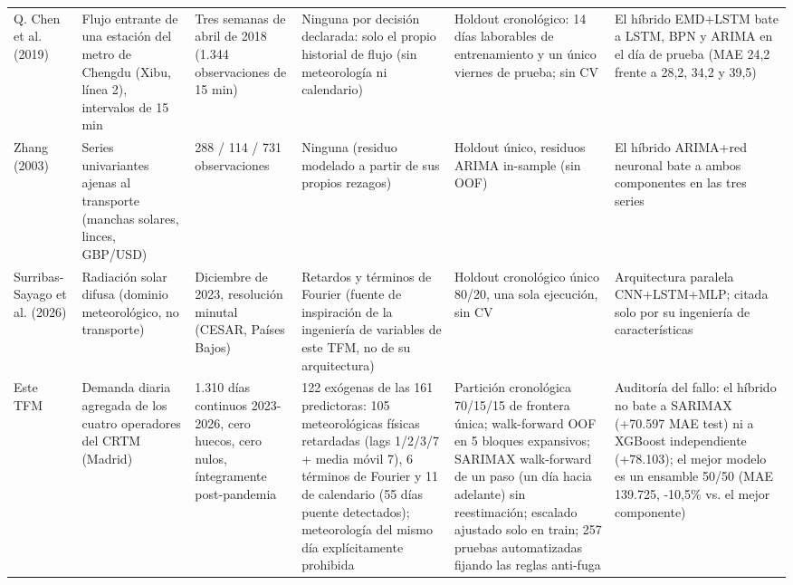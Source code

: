 \begin{tabular}{p{2.6cm}p{3.6cm}p{3.0cm}p{4.2cm}p{4.4cm}p{4.6cm}}
\rowcolor{filaclara} Q. Chen et al. (2019) & Flujo entrante de una estación del metro de Chengdu (Xibu, línea 2), intervalos de 15 min & Tres semanas de abril de 2018 (1.344 observaciones de 15 min) & Ninguna por decisión declarada: solo el propio historial de flujo (sin meteorología ni calendario) & Holdout cronológico: 14 días laborables de entrenamiento y un único viernes de prueba; sin CV & El híbrido EMD+LSTM bate a LSTM, BPN y ARIMA en el día de prueba (MAE 24,2 frente a 28,2, 34,2 y 39,5) \\
Zhang (2003) & Series univariantes ajenas al transporte (manchas solares, linces, GBP/\allowbreak{}USD) & 288 /\allowbreak{} 114 /\allowbreak{} 731 observaciones & Ninguna (residuo modelado a partir de sus propios rezagos) & Holdout único, residuos ARIMA in-sample (sin OOF) & El híbrido ARIMA+red neuronal bate a ambos componentes en las tres series \\
\rowcolor{filaclara} Surribas-Sayago et al. (2026) & Radiación solar difusa (dominio meteorológico, no transporte) & Diciembre de 2023, resolución minutal (CESAR, Países Bajos) & Retardos y términos de Fourier (fuente de inspiración de la ingeniería de variables de este TFM, no de su arquitectura) & Holdout cronológico único 80/\allowbreak{}20, una sola ejecución, sin CV & Arquitectura paralela CNN+LSTM+MLP; citada solo por su ingeniería de características \\
Este TFM & Demanda diaria agregada de los cuatro operadores del CRTM (Madrid) & 1.310 días continuos 2023-2026, cero huecos, cero nulos, íntegramente post-pandemia & 122 exógenas de las 161 predictoras: 105 meteorológicas físicas retardadas (lags 1/\allowbreak{}2/\allowbreak{}3/\allowbreak{}7 + media móvil 7), 6 términos de Fourier y 11 de calendario (55 días puente detectados); meteorología del mismo día explícitamente prohibida & Partición cronológica 70/\allowbreak{}15/\allowbreak{}15 de frontera única; walk-forward OOF en 5 bloques expansivos; SARIMAX walk-forward de un paso (un día hacia adelante) sin reestimación; escalado ajustado solo en train; 257 pruebas automatizadas fijando las reglas anti-fuga & Auditoría del fallo: el híbrido no bate a SARIMAX (+70.597 MAE test) ni a XGBoost independiente (+78.103); el mejor modelo es un ensamble 50/\allowbreak{}50 (MAE 139.725, -10,5\% vs. el mejor componente) \\
\bottomrule
\end{tabular}
